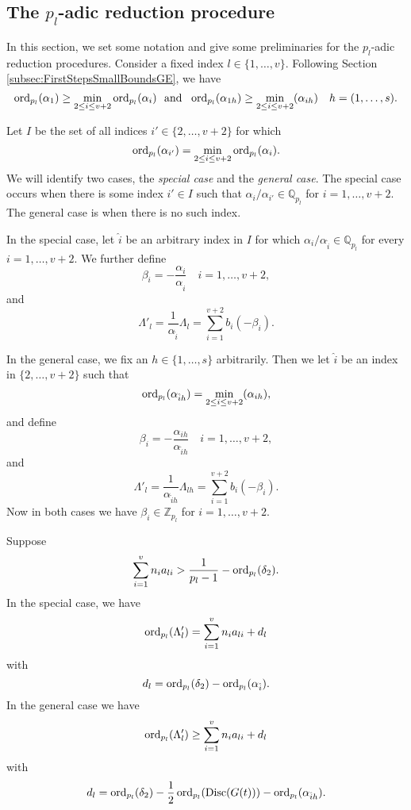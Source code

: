 
\subsection{The $p_l$-adic reduction procedure}

In this section, we set some notation and give some preliminaries for the $p_l$-adic reduction procedures. Consider a fixed index $l \in \{1, \dots, v\}$. Following Section \ref{subsec:FirstStepsSmallBoundsGE}, we have
\[\ord_{p_l}(\alpha_1) \geq \min_{2\leq i\leq v+2} \ord_{p_l}(\alpha_i) \  \text{ and } \ \ord_{p_l}(\alpha_{1h}) \geq \min_{2\leq i\leq v+2}(\alpha_{ih}) \quad h = (1, \dots, s).\]

Let $I$ be the set of all indices $i' \in \{2, \dots, v+2\}$ for which
\[\operatorname{ord}_{p_l}(\alpha_{i'}) = \min_{2\leq i\leq v+2} \operatorname{ord}_{p_l}(\alpha_i).\]
We will identify two cases, the \textit{special case} and the \textit{general case}. The special case occurs when there is some index $i' \in I$ such that $\alpha_i/\alpha_{i'} \in \mathbb{Q}_{p_l}$ for $i = 1, \dots, v+2$. The general case is when there is no such index. 

In the special case, let $\hat{i}$ be an arbitrary index in $I$ for which $\alpha_i/\alpha_{\hat{i}} \in \mathbb{Q}_{p_l}$ for every $i = 1, \dots, v+2$. We further define
\[\beta_i = - \frac{\alpha_i}{\alpha_{\hat{i}}} \quad i = 1, \dots, v+2,\]
and 
\[\Lambda'_l = \frac{1}{\alpha_{\hat{i}}}\Lambda_l = \sum_{i = 1}^{v+2} b_i(-\beta_i).\]

In the general case, we fix an $h \in \{1, \dots, s\}$ arbitrarily. Then we let $\hat{i}$ be an index in $\{2, \dots, v+2\}$ such that 
\[ \operatorname{ord}_{p_l}(\alpha_{\hat{i}h}) = \min_{2\leq i\leq v+2}(\alpha_{ih}),\]
and define
\[\beta_i = - \frac{\alpha_{ih}}{\alpha_{\hat{i}h}} \quad i = 1, \dots, v+2,\]
and 
\[\Lambda'_l = \frac{1}{\alpha_{\hat{i}h}}\Lambda_{lh} = \sum_{i = 1}^{v+2} b_i(-\beta_i).\]
Now in both cases we have $\beta_i \in \mathbb{Z}_{p_l}$ for $i = 1, \dots, v+2$. 

\begin{lemma} \label{Lem:19.1}
Suppose
\[\sum_{i = 1}^v n_{i}a_{li} > \frac{1}{p_l-1} - \operatorname{ord}_{p_l}(\delta_2).\]
In the special case, we have 
\[\operatorname{ord}_{p_l}(\Lambda_l') = \sum_{i = 1}^v n_{i}a_{li} + d_l\]
with
\[d_l = \operatorname{ord}_{p_l}(\delta_2) - \operatorname{ord}_{p_l}(\alpha_{\hat{i}}).\]
In the general case we have
\[\operatorname{ord}_{p_l}(\Lambda_{l}') \geq \sum_{i = 1}^v n_{i}a_{li} + d_l\]
with 
\[d_l = \operatorname{ord}_{p_l}(\delta_2) - \frac{1}{2}\operatorname{ord}_{p_l}(\text{Disc}(G(t))) - \operatorname{ord}_{p_l}(\alpha_{\hat{i}h}).\]
\end{lemma}

